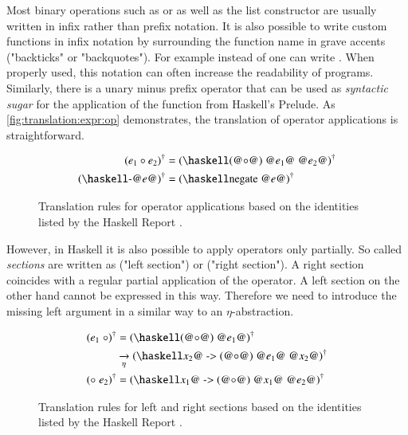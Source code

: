 Most binary operations such as \haskell{(+)} or \haskell{(==)} as well as the list constructor \haskell{(:)} are usually written in infix rather than prefix notation.
It is also possible to write custom functions in infix notation by surrounding the function name in grave accents ("backticks" or "backquotes").
For example instead of  one can write .
When properly used, this notation can often increase the readability of programs.
Similarly, there is a unary minus prefix operator that can be used as \textit{syntactic sugar} for the application of the  function from Haskell's Prelude.
As \autoref{fig:translation:expr:op} demonstrates, the translation of operator applications is straightforward.

\begin{figure}[H]
  \begin{align*}
    \toCoq{(e_1 \circ e_2)} &= \toCoq{(\haskellM{(@$\circ$@) @$e_1$@ @$e_2$@})} \\
    \toCoq{(\haskellM{-@$e$@})} &= \toCoq{(\haskellM{negate @$e$@})}
  \end{align*}
  \caption{
    Translation rules for operator applications based on the identities listed by the Haskell Report \cite[p.~18]{Marlow:2010}.
  }
  \label{fig:translation:expr:op}
\end{figure}

However, in Haskell it is also possible to apply operators only partially.
So called \textit{sections} are written as  ("left section") or  ("right section").
A right section coincides with a regular partial application of the operator.
A left section on the other hand cannot be expressed in this way.
Therefore we need to introduce the missing left argument in a similar way to an $\eta$-abstraction.
\begin{figure}[H]
  \begin{align*}
    \toCoq{(e_1\;\circ)}
      &= \toCoq{(\haskellM{(@$\circ$@) @$e_1$@})}                                        \\
      &\xrightarrow[\eta]{} \toCoq{(\haskellM{\@$x_2$@ -> (@$\circ$@) @$e_1$@ @$x_2$@})} \\
    \toCoq{(\circ\;e_2)}
      &= \toCoq{(\haskellM{\@$x_1$@ -> (@$\circ$@) @$x_1$@ @$e_2$@})}
  \end{align*}
  \caption{
    Translation rules for left and right sections based on the identities listed by the Haskell Report \cite[p.~19]{Marlow:2010}.
  }
  \label{fig:translation:expr:op}
\end{figure}

